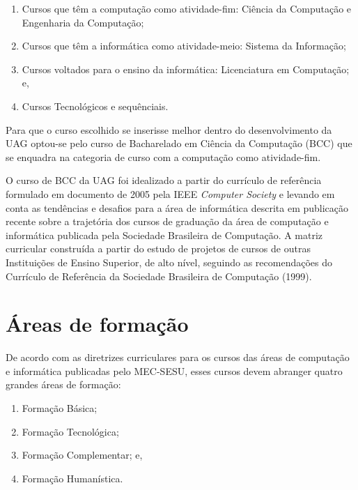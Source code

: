 \documentclass[
	12pt,				%
	openright,			%
  oneside,     %
	a4paper,			%
	english,			%
	french,				%
	spanish,			%
	brazil				%
	]{abntex2}
\begin{document}
\begin{enumerate}
  \item Cursos que têm a computação como atividade-fim: Ciência da Computação e
  Engenharia da Computação;
  \item Cursos que têm a informática como atividade-meio: Sistema da Informação;
  \item Cursos voltados para o ensino da informática: Licenciatura em
 Computação; e,
  \item Cursos Tecnológicos e sequênciais.
\end{enumerate}

Para que o curso escolhido se inserisse melhor dentro do desenvolvimento da UAG
optou-se pelo curso de Bacharelado em Ciência da Computação (BCC) que se
enquadra na categoria de curso com a computação como atividade-fim.

O curso de BCC da UAG foi idealizado a partir do currículo de referência
formulado em documento de 2005 pela IEEE \textit{Computer Society} e levando em conta as
tendências e desafios para a área de informática descrita em publicação recente
sobre a trajetória dos cursos de graduação da área de computação e informática
publicada pela Sociedade Brasileira de Computação. A matriz curricular
construída a partir do estudo de projetos de cursos de outras Instituições de
Ensino Superior, de alto nível, seguindo as recomendações do Currículo de
Referência da Sociedade Brasileira de Computação (1999).
	
\section{Áreas de formação}

De acordo com as diretrizes curriculares para os cursos das áreas de computação
e informática publicadas pelo MEC-SESU, esses cursos devem abranger quatro
grandes áreas de formação:
\begin{enumerate}
  \item Formação Básica;
  \item Formação Tecnológica;
  \item Formação Complementar; e,
  \item Formação Humanística.
\end{enumerate}


%
%
\end{document}
